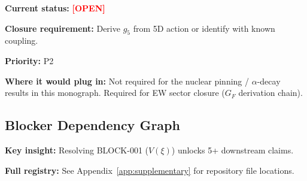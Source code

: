\documentclass[11pt,a4paper]{article}
\newcommand{\tagOPEN}{\textcolor{red}{\textbf{[OPEN]}}}
\begin{document}
\textbf{Current status:} \tagOPEN{}

\textbf{Closure requirement:} Derive $g_5$ from 5D action or identify with known coupling.

\textbf{Priority:} P2

\textbf{Where it would plug in:} Not required for the nuclear pinning / $\alpha$-decay results in this monograph. Required for EW sector closure ($G_F$ derivation chain).

\subsection{Blocker Dependency Graph}

\begin{center}
\end{center}

\textbf{Key insight:} Resolving BLOCK-001 ($V(\xi)$) unlocks 5+ downstream claims.

\textbf{Full registry:} See Appendix~\ref{app:supplementary} for repository file locations.
\end{document}
